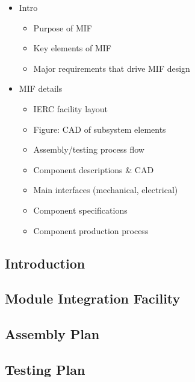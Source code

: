 \begin{itemize}
    \item Intro 
    \begin{itemize}
        \item Purpose of MIF
        \item Key elements of MIF
        \item Major requirements that drive MIF design
    \end{itemize}
    \item MIF details
    \begin{itemize}
        \item IERC facility layout
        \item Figure: CAD of subsystem elements       \item Assembly/testing process flow
        \item Component descriptions \& CAD
        \item Main interfaces (mechanical, electrical)
        \item Component specifications
        \item Component production process
    \end{itemize}
\end{itemize}

\subsection{Introduction}

\subsection{Module Integration Facility}

\subsection{Assembly Plan}

\subsection{Testing Plan}


